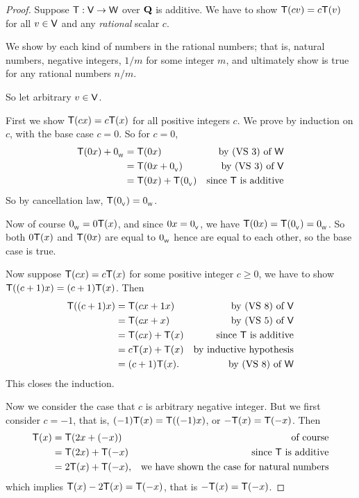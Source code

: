 \begin{proof}
Suppose \(\textsf{T} : \textsf{V} \to \textsf{W}\) over \(\mathbf{Q}\) is additive.
We have to show \(\textsf{T}(cv) = c\textsf{T}(v)\)  for all \(v \in \textsf{V}\) and any \emph{rational} scalar \(c\).

We show  by each kind of numbers in the rational numbers;
that is, natural numbers, negative integers, \(1/m\) for some integer \(m\), and ultimately show  is true for any rational numbers \(n/m\).

So let arbitrary \(v \in \textsf{V}\).

First we show \(\textsf{T}(cx) = c\textsf{T}(x)\) for all positive integers \(c\).
We prove by induction on \(c\), with the base case \(c = 0\).
So for \(c = 0\),
\begin{align*}
    \textsf{T}(0x) + 0_{_{\textsf{W}}} & = \textsf{T}(0x) & \text{by (VS 3) of \(\textsf{W}\)} \\
                 & = \textsf{T}(0x + 0_{_{\textsf{V}}}) & \text{by (VS 3) of \(\textsf{V}\)} \\
                 & = \textsf{T}(0x) + \textsf{T}(0_{_{\textsf{V}}}) & \text{since \(\textsf{T}\) is additive}
\end{align*}
So by cancellation law, \(\textsf{T}(0_{_{\textsf{V}}}) = 0_{_{\textsf{W}}}\).

Now of course \(0_{_{\textsf{W}}} = 0\textsf{T}(x)\), and since \(0x = 0_{_{\textsf{V}}}\), we have \(\textsf{T}(0x) = \textsf{T}(0_{_{\textsf{V}}}) = 0_{_{\textsf{W}}}\).
So both \(0\textsf{T}(x)\) and \(\textsf{T}(0x)\) are equal to \(0_{_{\textsf{W}}}\) hence are equal to each other, so the base case is true.

Now suppose \(\textsf{T}(cx) = c\textsf{T}(x)\) for some positive integer \(c \ge 0\), we have to show \(\textsf{T}((c + 1)x) = (c + 1)\textsf{T}(x)\).
Then
\begin{align*}
    \textsf{T}((c + 1)x) & = \textsf{T}(cx + 1x) & \text{by (VS 8) of \(\textsf{V}\)} \\
                 & = \textsf{T}(cx + x) & \text{by (VS 5) of \(\textsf{V}\)} \\
                 & = \textsf{T}(cx) + \textsf{T}(x) & \text{since \(\textsf{T}\) is additive} \\
                 & = c\textsf{T}(x) + \textsf{T}(x) & \text{by inductive hypothesis} \\
                 & = (c + 1)\textsf{T}(x). & \text{by (VS 8) of \(\textsf{W}\)}
\end{align*}
This closes the induction.

Now we consider the case that \(c\) is arbitrary negative integer.
But we first consider \(c = -1\), that is, \((-1)\textsf{T}(x) = \textsf{T}((-1)x)\), or \(-\textsf{T}(x) = \textsf{T}(-x)\).
Then
\begin{align*}
    \textsf{T}(x) & = \textsf{T}(2x + (-x)) & \text{of course} \\
          & = \textsf{T}(2x) + \textsf{T}(-x) & \text{since \(\textsf{T}\) is additive} \\
          & = 2\textsf{T}(x) + \textsf{T}(-x), & \text{we have shown the case for natural numbers}
\end{align*}
which implies \(\textsf{T}(x) - 2\textsf{T}(x) = \textsf{T}(-x)\), that is \(-\textsf{T}(x) = \textsf{T}(-x)\).


\end{proof}
